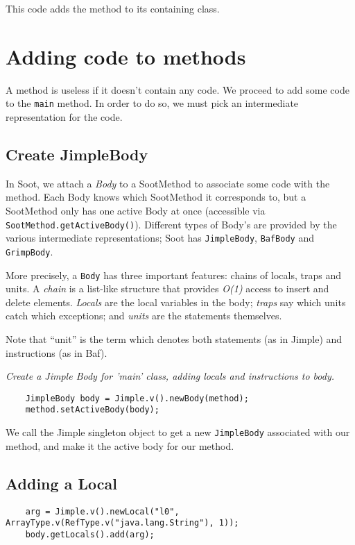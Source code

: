\documentclass{article}
\begin{document}
This code adds the method to its containing class.

\section{Adding code to methods}

A method is useless if it doesn't contain any code.  We proceed to add some
code to the {\tt main} method.  In order to do so, we must pick an intermediate
representation for the code.

\subsection{Create JimpleBody}

In Soot, we attach a {\em Body} to a SootMethod to associate some code with
the method.  Each Body knows which SootMethod it corresponds to, but a SootMethod
only has one active Body at once (accessible via {\tt SootMethod.getActiveBody()}).
Different types of Body's are provided by the various intermediate representations;
Soot has {\tt JimpleBody}, {\tt BafBody} and {\tt GrimpBody}.

More precisely, a {\tt Body} has three important features: chains of
locals, traps and units.  A {\em chain} is a list-like structure that
provides {\em O(1)} access to insert and delete elements.  {\em Locals}
are the local variables in the body; {\em traps} say which units catch
which exceptions; and {\em units} are the statements themselves.

Note that ``unit'' is the term which denotes both statements (as in Jimple)
and instructions (as in Baf).

{\em Create a Jimple Body for 'main' class, adding locals and instructions to body.}

\begin{verbatim}
    JimpleBody body = Jimple.v().newBody(method);
    method.setActiveBody(body);
\end{verbatim}

We call the Jimple singleton object to get a new {\tt JimpleBody} associated
with our method, and make it the active body for our method.

\subsection{Adding a Local}

\begin{verbatim}
    arg = Jimple.v().newLocal("l0", ArrayType.v(RefType.v("java.lang.String"), 1));
    body.getLocals().add(arg);
\end{verbatim}
\end{document}

